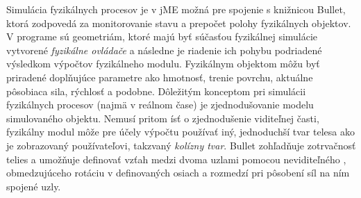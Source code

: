 Simulácia fyzikálnych procesov je v jME možná pre spojenie s knižnicou Bullet, ktorá zodpovedá za monitorovanie stavu a prepočet polohy fyzikálnych objektov. V programe sú geometriám, ktoré majú byť súčasťou fyzikálnej simulácie vytvorené \textit{fyzikálne ovládače} a následne je riadenie ich pohybu podriadené výsledkom výpočtov fyzikálneho modulu. Fyzikálnym objektom môžu byť priradené doplňujúce parametre ako hmotnosť, trenie povrchu, aktuálne pôsobiaca sila, rýchlosť a podobne. Dôležitým konceptom pri simulácii fyzikálnych procesov (najmä v reálnom čase) je zjednodušovanie modelu simulovaného objektu. Nemusí pritom ísť o zjednodušenie viditeľnej časti, fyzikálny modul môže pre účely výpočtu používať iný, jednoduchší tvar telesa ako je zobrazovaný používateľovi, takzvaný \textit{kolízny tvar}. Bullet zohľadňuje zotrvačnosť telies a umožňuje definovať vzťah medzi dvoma uzlami pomocou neviditeľného , obmedzujúceho rotáciu v definovaných osiach a rozmedzí pri pôsobení síl na ním spojené uzly.


